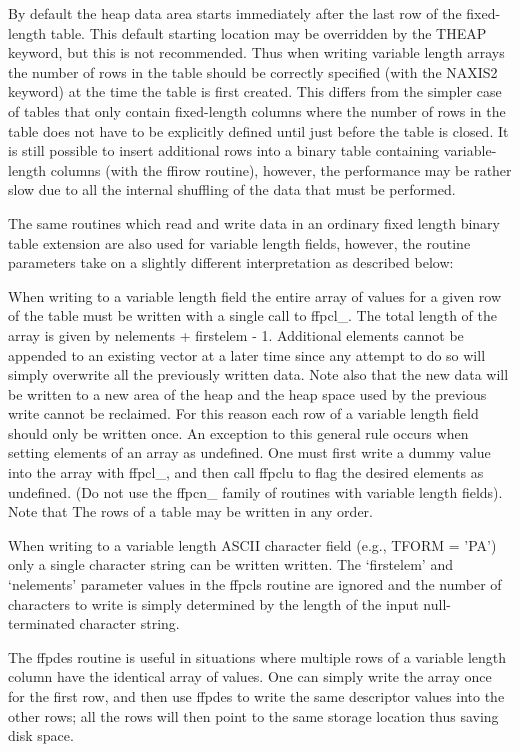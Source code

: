 By default the heap data area starts immediately after the last row of
the fixed-length table.  This default starting location may be
overridden by the THEAP keyword, but this is not recommended.  Thus
when writing variable length arrays the number of rows in the table
should be correctly specified (with the NAXIS2 keyword) at the time the
table is first created.  This differs from the simpler case of tables
that only contain fixed-length columns where the number of rows in the
table does not have to be explicitly defined until just before the
table is closed.  It is still possible to insert additional rows into a
binary table containing variable-length columns (with the ffirow
routine), however, the performance may be rather slow due to all the
internal shuffling of the data that must be performed.

The same routines which read and write data in an ordinary fixed length
binary table extension are also used for variable length fields,
however, the routine parameters take on a slightly different
interpretation as described below:

When writing to a variable length field the entire array of values for
a given row of the table must be written with a single call to
ffpcl\_.  The total length of the array is given by nelements +
firstelem - 1.  Additional elements cannot be appended to an existing
vector at a later time since any attempt to do so will simply overwrite
all the previously written data.  Note also that the new data will be
written to a new area of the heap and the heap space used by the
previous write cannot be reclaimed.  For this reason each row of a
variable length field should only be written once.  An exception to
this general rule occurs when setting elements of an array as
undefined.  One must first write a dummy value into the array with
ffpcl\_, and then call ffpclu to flag the desired elements as
undefined.  (Do not use the ffpcn\_ family of routines with variable
length fields). Note that The rows of a table may be written in any
order.

When writing to a variable length ASCII character field (e.g., TFORM =
'PA') only a single character string can be written written.  The
`firstelem' and `nelements' parameter values in the ffpcls routine are
ignored and the number of characters to write is simply determined by
the length of the input null-terminated character string.

The ffpdes routine is useful in situations where multiple rows of a
variable length column have the identical array of values.  One can
simply write the array once for the first row, and then use ffpdes to
write the same descriptor values into the other rows;  all the rows
will then point to the same storage location thus saving disk space.

